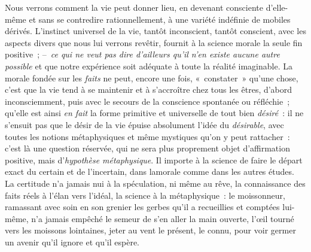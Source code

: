 \documentclass[french,twoside]{book} %
\begin{document}
Nous verrons comment la vie peut donner lieu, en devenant consciente d’elle-même et sans se contredire rationnellement, à une variété indéfinie de mobiles dérivés. L’instinct universel de la vie, tantôt inconscient, tantôt conscient, avec les aspects divers que nous lui verrons revêtir, fournit à la science morale la seule fin positive ; – \emph{ce qui ne veut pas dire d’ailleurs qu’il n’en existe aucune autre possible} et que notre expérience soit adéquate à toute la réalité imaginable. La morale fondée sur les \emph{faits} ne peut, encore une fois, « constater » qu’une chose, c’est que la vie tend à se maintenir et à s’accroître chez tous les êtres, d’abord inconsciemment, puis avec le secours de la conscience spontanée ou réfléchie ; qu’elle est ainsi \emph{en fait} la forme primitive et universelle de tout bien \emph{désiré} : il ne s’ensuit pas que le désir de la vie épuise absolument l’idée du \emph{désirable}, avec toutes les notions métaphysiques et même mystiques qu’on y peut rattacher : c’est là une question réservée, qui ne sera plus proprement objet d’affirmation positive, mais d’\emph{hypothèse métaphysique}. Il importe à la science de faire le départ exact du certain et de l’incertain, dans lamorale comme dans les autres études. La certitude n’a jamais nui à la spéculation, ni même au rêve, la connaissance des faits réels à l’élan vers l’idéal, la science à la métaphysique : le moissonneur, ramassant avec soin en son grenier les gerbes qu’il a recueillies et comptées lui-même, n’a jamais empêché le semeur de s’en aller la main ouverte, l’œil tourné vers les moissons lointaines, jeter au vent le présent, le connu, pour voir germer un avenir qu’il ignore et qu’il espère.
\end{document}
